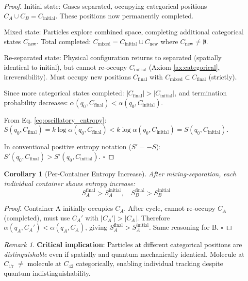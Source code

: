 \documentclass[11pt,a4paper]{article}
\newtheorem{corollary}[theorem]{Corollary}
\theoremstyle{definition}
\theoremstyle{remark}
\newtheorem{remark}[theorem]{Remark}
\begin{document}
\begin{proof}
Initial state: Gases separated, occupying categorical positions $C_A \cup C_B = C_{\text{initial}}$. These positions now permanently completed.

Mixed state: Particles explore combined space, completing additional categorical states $C_{\text{new}}$. Total completed: $C_{\text{mixed}} = C_{\text{initial}} \cup C_{\text{new}}$ where $C_{\text{new}} \neq \emptyset$.

Re-separated state: Physical configuration returns to separated (spatially identical to initial), but cannot re-occupy $C_{\text{initial}}$ (Axiom \ref{ax:categorical}, irreversibility). Must occupy new positions $C_{\text{final}}$ with $C_{\text{mixed}} \subset C_{\text{final}}$ (strictly).

Since more categorical states completed: $|C_{\text{final}}| > |C_{\text{initial}}|$, and termination probability decreases: $\alpha(q_0, C_{\text{final}}) < \alpha(q_0, C_{\text{initial}})$.

From Eq. \eqref{eq:oscillatory_entropy}: $S(q_0, C_{\text{final}}) = k \log \alpha(q_0, C_{\text{final}}) < k \log \alpha(q_0, C_{\text{initial}}) = S(q_0, C_{\text{initial}})$.

In conventional positive entropy notation ($S' = -S$): $S'(q_0, C_{\text{final}}) > S'(q_0, C_{\text{initial}})$. $\square$
\end{proof}

\begin{corollary}[Per-Container Entropy Increase]
After mixing-separation, each individual container shows entropy increase:
\begin{equation}
S_A^{\text{final}} > S_A^{\text{initial}}, \quad S_B^{\text{final}} > S_B^{\text{initial}}
\end{equation}
\end{corollary}

\begin{proof}
Container A initially occupies $C_A$. After cycle, cannot re-occupy $C_A$ (completed), must use $C_A'$ with $|C_A'| > |C_A|$. Therefore $\alpha(q_A, C_A') < \alpha(q_A, C_A)$, giving $S_A^{\text{final}} > S_A^{\text{initial}}$. Same reasoning for B. $\square$
\end{proof}

\begin{remark}
\textbf{Critical implication}: Particles at different categorical positions are \textit{distinguishable} even if spatially and quantum mechanically identical. Molecule at $C_{17}$ $\neq$ molecule at $C_{42}$ categorically, enabling individual tracking despite quantum indistinguishability.
\end{remark}
\end{document}

